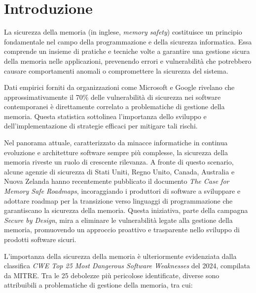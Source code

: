 \chapter{Introduzione}
\label{cha:introduction}

La sicurezza della memoria (in inglese, \textit{memory safety}) costituisce un
principio fondamentale nel campo della programmazione e della sicurezza
informatica. Essa comprende un insieme di pratiche e tecniche volte a garantire una
gestione sicura della memoria nelle applicazioni, prevenendo errori e
vulnerabilità che potrebbero causare comportamenti anomali o compromettere la
sicurezza del sistema.

\vspace{0.5em}

Dati empirici forniti da organizzazioni come Microsoft\cite{microsoft_proactive_approach}
e Google\cite{chromium_memory_safety} rivelano che approssimativamente il 70\%
delle vulnerabilità di sicurezza nei software contemporanei è direttamente
correlato a problematiche di gestione della memoria. Questa statistica sottolinea
l'importanza dello sviluppo e dell'implementazione di strategie efficaci per mitigare
tali rischi.

\vspace{0.5em}

Nel panorama attuale, caratterizzato da minacce informatiche in continua evoluzione
e architetture software sempre più complesse, la sicurezza della memoria riveste
un ruolo di crescente rilevanza. A fronte di questo scenario, alcune agenzie di
sicurezza di Stati Uniti, Regno Unito, Canada, Australia e Nuova Zelanda hanno recentemente
pubblicato il documento \textit{The Case for Memory Safe Roadmaps}\cite{memory_safe_roadmaps},
incoraggiando i produttori di software a sviluppare e adottare roadmap per la
transizione verso linguaggi di programmazione che garantiscano la sicurezza
della memoria. Questa iniziativa, parte della campagna \textit{Secure by Design},
mira a eliminare le vulnerabilità legate alla gestione della memoria, promuovendo
un approccio proattivo e trasparente nello sviluppo di prodotti software sicuri.

\vspace{0.5em}

L'importanza della sicurezza della memoria è ulteriormente evidenziata dalla
classifica \textit{CWE Top 25 Most Dangerous Software Weaknesses}\cite{cwe_top25_2024}
del 2024, compilata da MITRE. Tra le 25 debolezze più pericolose identificate, diverse
sono attribuibili a problematiche di gestione della memoria, tra cui:

